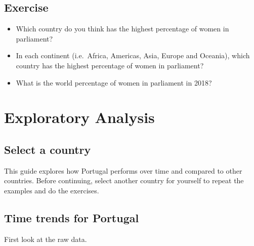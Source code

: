 \documentclass[a4paper,9pt,twocolumn,twoside,printwatermark=true]{pinp}
\providecommand{\tightlist}{%
  \setlength{\itemsep}{0pt}\setlength{\parskip}{0pt}}
\begin{document}
\subsection{Exercise}\label{exercise-3}

\begin{itemize}
\tightlist
\item
  Which country do you think has the highest percentage of women in
  parliament?
\item
  In each continent (i.e.~Africa, Americas, Asia, Europe and Oceania),
  which country has the highest percentage of women in parliament?
\item
  What is the world percentage of women in parliament in 2018?
\end{itemize}

\section{Exploratory Analysis}\label{exploratory-analysis}

\subsection{Select a country}\label{select-a-country}

This guide explores how Portugal performs over time and compared to
other countries. Before continuing, select another country for yourself
to repeat the examples and do the exercises.

\subsection{Time trends for Portugal}\label{time-trends-for-portugal}

First look at the raw data.
\end{document}
